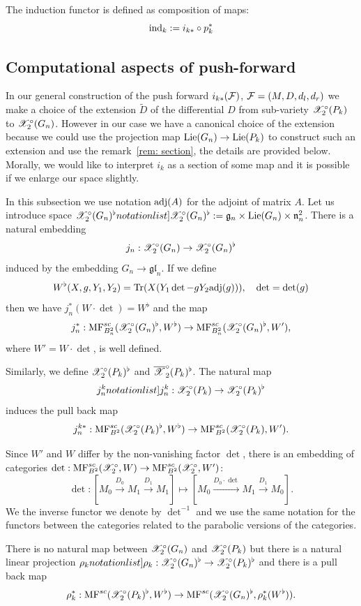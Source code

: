 The induction functor is defined as composition of maps:
$$  \mathrm{ind}_k:=i_{k*}\circ p_k^*$$


\subsection{Computational aspects of push-forward}\label{ssec: comp ins}
In our general construction of the push forward $i_{k*}(\mathcal{F})$, $\mathcal{F}=(M,D,d_l,d_r)$  we make a choice of the extension $\tilde{D}$ of the differential $D$
from sub-variety $\mathscr{X}^\circ_2(P_k)$ to $\mathscr{X}^\circ_2(G_n)$. However in our case we have a canonical choice of
the extension because we could use the projection map $\mathrm{Lie}(G_n)\to \mathrm{Lie}(P_{k})$ to construct such an extension and use the remark~\ref{rem: section}, the details are provided below.
Morally, we would like to interpret $i_{k}$ as a section of some map and it is possible if we enlarge our space slightly.


In this subsection we use notation $\mathrm{adj}(A)$ for the adjoint of matrix $A$.
Let us introduce space $\SymbolPrint{\calX^\circ_2(G_n)^\flat}:=\frg_n\times \Lie(G_n) \times \frn_n^{2}$. There is
a natural embedding $$j_n: \mathscr{X}_2^\circ(G_n)\to \mathscr{X}_2^\circ(G_n)^\flat$$ induced by the embedding $G_n\to \mathfrak{gl}_n$. If we define
\[W^\flat(X,g,Y_1,Y_2)=
\mathop{{\rm Tr}}\nolimits(X( Y_1\det- gY_2\mathrm{adj}(g))),\quad \det=\det(g)\] then we have
$j^*_n(W\cdot\det)=W^\flat$ and the map \[j^*_n: \mathrm{MF}^{sc}_{B^2_n}(\mathscr{X}_2^\circ(G_n)^\flat,W^\flat)\to \mathrm{MF}^{sc}_{B^2_n}(\mathscr{X}_2^\circ(G_n)^\flat,W'),\]
where \(W'=W\cdot\det\), is well defined.

Similarly, we define  $\mathscr{X}^\circ_2(P_k)^\flat$ and $\overline{\mathscr{X}}^\circ_2(P_k)^\flat$.
  The natural  map $$\SymbolPrint{j^k_n}: \calX^\circ_2(P_k)\to \calX^\circ_2(P_k)^\flat$$
induces the pull back map $$j^{k*}_{n}: \mathrm{MF}^{sc}_{B^2}(\mathscr{X}^\circ_2(P_k)^\flat,W^\flat)\to \mathrm{MF}^{sc}_{B^2}(\mathscr{X}^\circ_2(P_k),W').$$


Since \(W'\) and \(W\) differ by the non-vanishing factor \(\det\), there is an embedding of categories \(\det: \mathrm{MF}^{sc}_{B^2}(\mathscr{X}^{\circ}_2,W)\rightarrow\mathrm{MF}^{sc}_{B^2}(\mathscr{X}^{\circ}_2,W')\):
\[\det: [M_0\xrightarrow{D_0} M_1\xrightarrow{D_1} M_1]\mapsto [M_0\xrightarrow{D_0\cdot \det} M_1\xrightarrow{D_1}M_0]. \]
We the inverse functor we denote by \(\det^{-1}\) and we use the same notation for the functors between the categories related to the parabolic versions of
the categories.


There is no natural map between $\mathscr{X}^\circ_2(G_n)$ and $\mathscr{X}^\circ_2(P_k)$ but there is a natural linear projection $\SymbolPrint{\rho_k}: \calX^\circ_2(G_n)^\flat\to
\calX_2^\circ(P_k)^\flat$ and
there is a pull back map $$\rho_k^*: \mathrm{MF}^{sc}(\mathscr{X}_2^\circ(P_k)^\flat,W^\flat)\to \mathrm{MF}^{sc}(\mathscr{X}_2^\circ(G_n)^\flat,\rho_k^*(W^\flat)).$$

